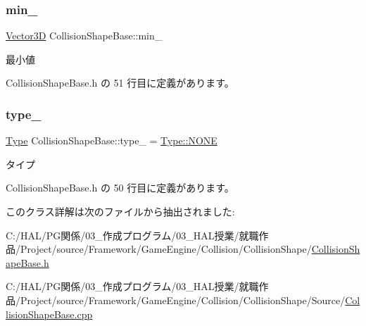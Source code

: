 \subsubsection{\texorpdfstring{min\+\_\+}{min\_}}
{\footnotesize\ttfamily \mbox{\hyperlink{class_vector3_d}{Vector3D}} Collision\+Shape\+Base\+::min\+\_\+\hspace{0.3cm}{\ttfamily [private]}}



最小値 



 Collision\+Shape\+Base.\+h の 51 行目に定義があります。

\mbox{\label{class_collision_shape_base_a46413b1e4d4b3a35075232fa9012addb}} 
\subsubsection{\texorpdfstring{type\+\_\+}{type\_}}
{\footnotesize\ttfamily \mbox{\hyperlink{class_collision_shape_base_a8abcef092855ad0ca191047044b002cb}{Type}} Collision\+Shape\+Base\+::type\+\_\+ = \mbox{\hyperlink{class_collision_shape_base_a8abcef092855ad0ca191047044b002cbab50339a10e1de285ac99d4c3990b8693}{Type\+::\+N\+O\+NE}}\hspace{0.3cm}{\ttfamily [private]}}



タイプ 



 Collision\+Shape\+Base.\+h の 50 行目に定義があります。



このクラス詳解は次のファイルから抽出されました\+:\begin{DoxyCompactItemize}
\item 
C\+:/\+H\+A\+L/\+P\+G関係/03\+\_\+作成プログラム/03\+\_\+\+H\+A\+L授業/就職作品/\+Project/source/\+Framework/\+Game\+Engine/\+Collision/\+Collision\+Shape/\mbox{\hyperlink{_collision_shape_base_8h}{Collision\+Shape\+Base.\+h}}\item 
C\+:/\+H\+A\+L/\+P\+G関係/03\+\_\+作成プログラム/03\+\_\+\+H\+A\+L授業/就職作品/\+Project/source/\+Framework/\+Game\+Engine/\+Collision/\+Collision\+Shape/\+Source/\mbox{\hyperlink{_collision_shape_base_8cpp}{Collision\+Shape\+Base.\+cpp}}\end{DoxyCompactItemize}
